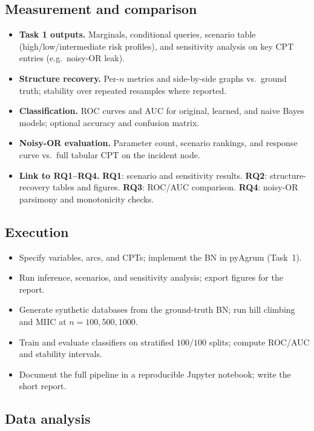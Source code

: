 \documentclass[11pt,a4paper]{article}
\begin{document}
\subsection*{Measurement and comparison}

\begin{itemize}[leftmargin=*]
  \item \textbf{Task 1 outputs.} Marginals, conditional queries, scenario table (high/low/intermediate risk profiles), and sensitivity analysis on key CPT entries (e.g.\ noisy-OR leak).
  \item \textbf{Structure recovery.} Per-$n$ metrics and side-by-side graphs vs.\ ground truth; stability over repeated resamples where reported.
  \item \textbf{Classification.} ROC curves and AUC for original, learned, and naive Bayes models; optional accuracy and confusion matrix.
  \item \textbf{Noisy-OR evaluation.} Parameter count, scenario rankings, and response curve vs.\ full tabular CPT on the incident node.
  \item \textbf{Link to RQ1--RQ4.} \textbf{RQ1}: scenario and sensitivity results. \textbf{RQ2}: structure-recovery tables and figures. \textbf{RQ3}: ROC/AUC comparison. \textbf{RQ4}: noisy-OR parsimony and monotonicity checks.
\end{itemize}

\subsection*{Execution}

\begin{itemize}[leftmargin=*]
  \item Specify variables, arcs, and CPTs; implement the BN in pyAgrum (Task~1).
  \item Run inference, scenarios, and sensitivity analysis; export figures for the report.
  \item Generate synthetic databases from the ground-truth BN; run hill climbing and MIIC at $n=100,500,1000$.
  \item Train and evaluate classifiers on stratified $100/100$ splits; compute ROC/AUC and stability intervals.
  \item Document the full pipeline in a reproducible Jupyter notebook; write the short report.
\end{itemize}

\subsection*{Data analysis}
\end{document}
